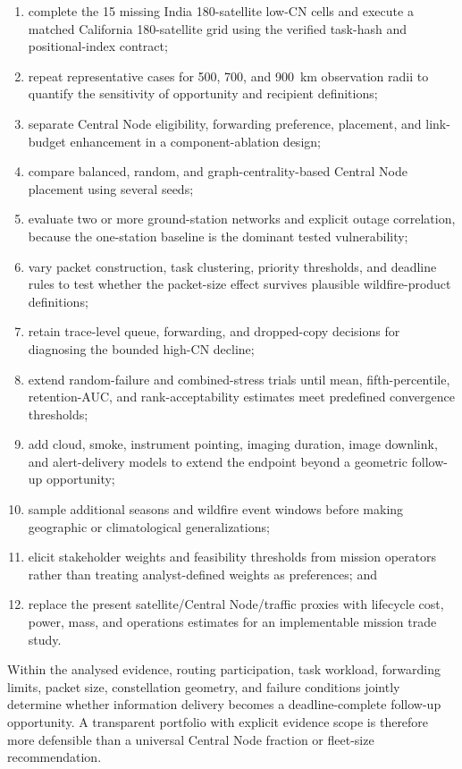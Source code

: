 \begin{enumerate}
\item complete the 15 missing India 180-satellite low-CN cells and execute a matched California 180-satellite grid using the verified task-hash and positional-index contract;
\item repeat representative cases for 500, 700, and 900~km observation radii to quantify the sensitivity of opportunity and recipient definitions;
\item separate Central Node eligibility, forwarding preference, placement, and link-budget enhancement in a component-ablation design;
\item compare balanced, random, and graph-centrality-based Central Node placement using several seeds;
\item evaluate two or more ground-station networks and explicit outage correlation, because the one-station baseline is the dominant tested vulnerability;
\item vary packet construction, task clustering, priority thresholds, and deadline rules to test whether the packet-size effect survives plausible wildfire-product definitions;
\item retain trace-level queue, forwarding, and dropped-copy decisions for diagnosing the bounded high-CN decline;
\item extend random-failure and combined-stress trials until mean, fifth-percentile, retention-AUC, and rank-acceptability estimates meet predefined convergence thresholds;
\item add cloud, smoke, instrument pointing, imaging duration, image downlink, and alert-delivery models to extend the endpoint beyond a geometric follow-up opportunity;
\item sample additional seasons and wildfire event windows before making geographic or climatological generalizations;
\item elicit stakeholder weights and feasibility thresholds from mission operators rather than treating analyst-defined weights as preferences; and
\item replace the present satellite/Central Node/traffic proxies with lifecycle cost, power, mass, and operations estimates for an implementable mission trade study.
\end{enumerate}

Within the analysed evidence, routing participation, task workload, forwarding limits, packet size, constellation geometry, and failure conditions jointly determine whether information delivery becomes a deadline-complete follow-up opportunity. A transparent portfolio with explicit evidence scope is therefore more defensible than a universal Central Node fraction or fleet-size recommendation.
